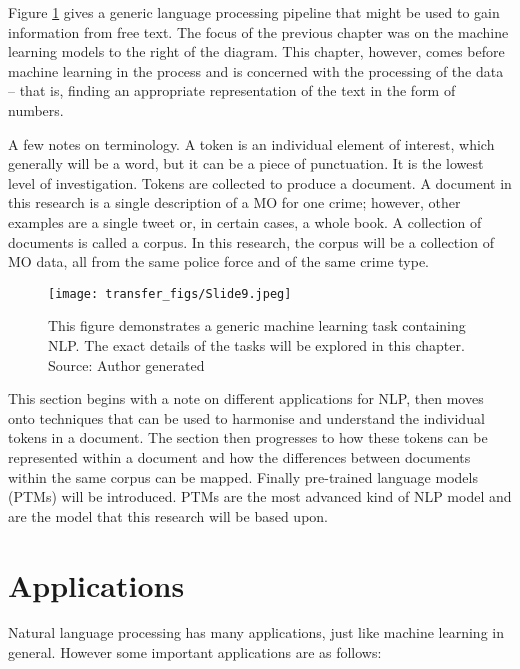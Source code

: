 Figure \ref{fig:overview} gives a generic language processing pipeline that might be used to gain information from free text. The focus of the previous chapter was on the machine learning models to the right of the diagram. This chapter, however, comes before machine learning in the process and is concerned with the processing of the data – that is, finding an appropriate representation of the text in the form of numbers.

A few notes on terminology. A token is an individual element of interest, which generally will be a word, but it can be a piece of punctuation. It is the lowest level of investigation. Tokens are collected to produce a document. A document in this research is a single description of a MO for one crime; however, other examples are a single tweet or, in certain cases, a whole book. A collection of documents is called a corpus. In this research, the corpus will be a collection of MO data, all from the same police force and of the same crime type.


\begin{figure}
  \texttt{[image: transfer\_figs/Slide9.jpeg]}
  \caption[NLP process Overview.]{This figure demonstrates a generic machine learning task containing NLP. The exact details of the tasks will be explored in this chapter. Source: Author generated}
  \label{fig:overview}
\end{figure}


This section begins with a note on different applications for NLP, then moves onto techniques that can be used to harmonise and understand the individual tokens in a document. The section then progresses to how these tokens can be represented within a document and how the differences between documents within the same corpus can be mapped. Finally pre-trained language models (PTMs) will be introduced. PTMs are the most advanced kind of NLP model and are the model that this research will be based upon.

\section{Applications}

Natural language processing has many applications, just like machine learning in general. However some important applications are as follows:

